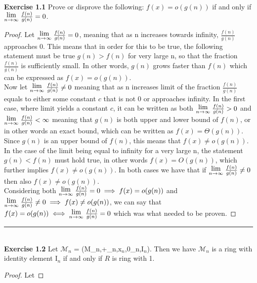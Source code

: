 \documentclass{article}
\newcommand{\Lim}[1]{\raisebox{0.5ex}{{$\displaystyle \lim_{#1}\;$}}}
\newcommand{\subtitle}[1]{%
  \posttitle{%
    \par\end{center}
    \begin{center}\LARGE#1\end{center}
    \vskip0.5em}%
}
\begin{document}
\subtitle{Lecture I}\\
\noindent \textbf{Exercise 1.1} Prove or disprove the following: $f(x) = o(g(n))$ if and only if $\Lim{n \to \infty} \frac{f(n)}{g(n)}=0$.
\begin{proof}
  Let $\Lim{n \to \infty} \frac{f(n)}{g(n)}=0$, meaning that as n increases towards infinity, $\frac{f(n)}{g(n)}$ approaches 0. This means that in order for this to be true, the following statement must be true $g(n) > f(n)$ for very large n, so that the fraction $\frac{f(n)}{g(n)}$ is sufficiently small. In other words, $g(n)$ grows faster than $f(n)$ which can be expressed as $f(x) = o(g(n))$. \\
  
  Now let $\Lim{n \to \infty} \frac{f(n)}{g(n)}\neq0$ meaning that as n increases limit of the fraction $\frac{f(n)}{g(n)}$ equals to either some constant $c$ that is not 0 or approaches infinity. In the first case, where limit yields a constant $c$, it can be written as both $\Lim{n \to \infty} \frac{f(n)}{g(n)}>0$ and $\Lim{n \to \infty} \frac{f(n)}{g(n)}<\infty$ meaning that $g(n)$ is both upper and lower bound of $f(n)$, or in other words an exact bound, which can be written as $f(x) = \Theta(g(n))$. Since $g(n)$ is an upper bound of $f(n)$, this means that $f(x) \neq o(g(n))$. In the case of the limit being equal to infinity for a very large n, the statement $g(n) < f(n)$ must hold true, in other words $f(x) = O(g(n))$, which further implies $f(x) \neq o(g(n))$. In both cases we have that if $\Lim{n \to \infty} \frac{f(n)}{g(n)}\neq0$ then also $f(x) \neq o(g(n))$. \\
  
  Considering both $\Lim{n \to \infty} \frac{f(n)}{g(n)}=0 \implies f(x) = o(g(n))$ and $\Lim{n \to \infty} \frac{f(n)}{g(n)}\neq0 \implies f(x) \neq o(g(n))$, we can say that $f(x) = o(g(n)) \iff \Lim{n \to \infty} \frac{f(n)}{g(n)}=0$ which was what needed to be proven.

\end{proof}
\noindent\rule{12cm}{0.4pt}\\
\noindent \textbf{Exercise 1.2} Let $\mathcal{M}_n$ = (M_n,+_n,$\mathrm{x}_n$,0_n,$\mathrm{I}_n$). Then we have $\mathcal{M}_n$ is a ring with identity element $\mathrm{I}_n$ if and only if $R$ is ring with 1.
\begin{proof}
  Let 
\end{proof}
\end{document}
